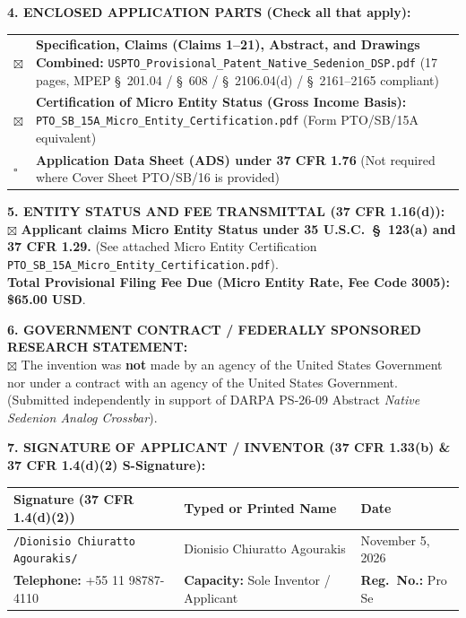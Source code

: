 \documentclass[11pt,letterpaper]{article}
\begin{document}
\vspace{6pt}
\textbf{4. ENCLOSED APPLICATION PARTS (Check all that apply):}\\[2pt]
\begin{tabular}{@{}lp{6.5in}@{}}
$\boxtimes$ & \textbf{Specification, Claims (Claims 1--21), Abstract, and Drawings Combined:} \texttt{USPTO\_Provisional\_Patent\_Native\_Sedenion\_DSP.pdf} (17 pages, MPEP \S\ 201.04 / \S\ 608 / \S\ 2106.04(d) / \S\ 2161--2165 compliant) \\
$\boxtimes$ & \textbf{Certification of Micro Entity Status (Gross Income Basis):} \texttt{PTO\_SB\_15A\_Micro\_Entity\_Certification.pdf} (Form PTO/SB/15A equivalent) \\
$\square$ & \textbf{Application Data Sheet (ADS) under 37 CFR 1.76} (Not required where Cover Sheet PTO/SB/16 is provided) \\
\end{tabular}

\vspace{6pt}
\textbf{5. ENTITY STATUS AND FEE TRANSMITTAL (37 CFR 1.16(d)):}\\[2pt]
$\boxtimes$ \textbf{Applicant claims Micro Entity Status under 35 U.S.C.\ \S\ 123(a) and 37 CFR 1.29.} (See attached Micro Entity Certification \texttt{PTO\_SB\_15A\_Micro\_Entity\_Certification.pdf}).\\
\textbf{Total Provisional Filing Fee Due (Micro Entity Rate, Fee Code 3005):} \textbf{\$65.00 USD}.

\vspace{6pt}
\textbf{6. GOVERNMENT CONTRACT / FEDERALLY SPONSORED RESEARCH STATEMENT:}\\[2pt]
$\boxtimes$ The invention was \textbf{not} made by an agency of the United States Government nor under a contract with an agency of the United States Government. (Submitted independently in support of DARPA PS-26-09 Abstract \textit{Native Sedenion Analog Crossbar}).

\vspace{8pt}
\textbf{7. SIGNATURE OF APPLICANT / INVENTOR (37 CFR 1.33(b) \& 37 CFR 1.4(d)(2) S-Signature):}\\[4pt]
\begin{tabular}{|p{2.6in}|p{2.3in}|p{1.6in}|}
\hline
\textbf{Signature (37 CFR 1.4(d)(2))} & \textbf{Typed or Printed Name} & \textbf{Date} \\
\hline
\rule{0pt}{18pt}\texttt{/Dionisio Chiuratto Agourakis/} & Dionisio Chiuratto Agourakis & November 5, 2026 \\
\hline
\textbf{Telephone:} +55 11 98787-4110 & \textbf{Capacity:} Sole Inventor / Applicant & \textbf{Reg.\ No.:} Pro Se \\
\hline
\end{tabular}
\end{document}

